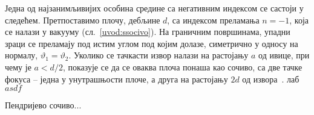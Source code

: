 \documentclass[12pt,oneside]{book}
\begin{document}
Једна од најзанимљивијих особина средине са негативним индексом се састоји у следећем. Претпоставимо плочу, дебљине $d$, са индексом преламања $n=-1$, која се налази у вакууму (сл.~\ref{uvod:ssocivo}). На граничним површинама, упадни зраци се преламају под истим углом под којим долазе, симетрично у односу на нормалу, $\vartheta_1 = \vartheta_2$. Уколико се тачкасти извор налази на растојању $a$ од ивице, при чему је $a<d/2$, показује се да се оваква плоча понаша као сочиво, са две тачке фокуса -- једна у унутрашњости плоче, а друга на растојању $2d$ од извора~\cite{veselago_cir}. лаб  $asdf$

Пендријево сочиво...



\end{document}
